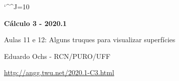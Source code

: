 \documentclass[oneside,12pt]{article}
\begin{document}
\catcode`\^^J=10



\long{}
\long{}
\long{}
\long{}
\long{}
\long{}
\long{}
\long{}
\long{}
\long{}

\long{}
\long{}

\def\frown{\ensuremath{{=}{(}}}
\def\True {\mathbf{V}}
\def\False{\mathbf{F}}

\def\drafturl{http://angg.twu.net/LATEX/2020-1-C2.pdf}
\def\drafturl{http://angg.twu.net/2020.1-C2.html}
\def\draftfooter{\tiny \href{\drafturl}{\jobname{}} \ColorBrown{\shorttoday{} \hours}}


%

\thispagestyle{empty}

\begin{center}

\vspace*{1.2cm}

{\bf \Large Cálculo 3 - 2020.1}

\bsk

Aulas 11 e 12: Alguns truques para visualizar superfícies

\bsk

Eduardo Ochs - RCN/PURO/UFF

\url{http://angg.twu.net/2020.1-C3.html}

\end{center}

\newpage
\end{document}

